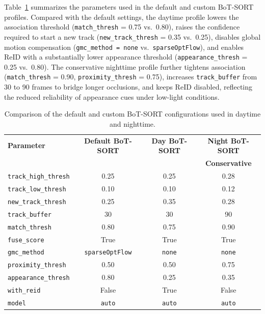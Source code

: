 Table~\ref{tab:botsort-config} summarizes the parameters used in the default and custom BoT-SORT profiles. Compared with the default settings, the daytime profile lowers the association threshold (\texttt{match\_thresh} = 0.75 vs.\ 0.80), raises the confidence required to start a new track (\texttt{new\_track\_thresh} = 0.35 vs.\ 0.25), disables global motion compensation (\texttt{gmc\_method = none} vs.\ \texttt{sparseOptFlow}), and enables ReID with a substantially lower appearance threshold (\texttt{appearance\_thresh} = 0.25 vs.\ 0.80). The conservative nighttime profile further tightens association (\texttt{match\_thresh} = 0.90, \texttt{proximity\_thresh} = 0.75), increases \texttt{track\_buffer} from 30 to 90 frames to bridge longer occlusions, and keeps ReID disabled, reflecting the reduced reliability of appearance cues under low-light conditions.

\begin{table}[H]
\centering
\small
\setlength{\tabcolsep}{8pt}
\renewcommand{\arraystretch}{1.15}
\caption[BoT-SORT configuration parameters]{Comparison of the default and custom BoT-SORT configurations used in daytime and nighttime.}
\begin{tabular}{@{}lccc@{}}
\textbf{Parameter} & \textbf{Default BoT-SORT} & \textbf{Day BoT-SORT} & \textbf{Night BoT-SORT} \\
& & & \textbf{Conservative} \\
\midrule
\texttt{track\_high\_thresh}  & 0.25          & 0.25          & 0.28 \\
\texttt{track\_low\_thresh}   & 0.10          & 0.10          & 0.12 \\
\texttt{new\_track\_thresh}   & 0.25          & 0.35          & 0.28 \\
\texttt{track\_buffer}        & 30            & 30            & 90   \\
\texttt{match\_thresh}        & 0.80          & 0.75          & 0.90 \\
\texttt{fuse\_score}          & True          & True          & True \\
\texttt{gmc\_method}          & \texttt{sparseOptFlow} & \texttt{none} & \texttt{none} \\
\texttt{proximity\_thresh}    & 0.50          & 0.50          & 0.75 \\
\texttt{appearance\_thresh}   & 0.80          & 0.25          & 0.35 \\
\texttt{with\_reid}           & False         & True          & False \\
\texttt{model}                & \texttt{auto} & \texttt{auto} & \texttt{auto} \\
\bottomrule
\end{tabular}
\label{tab:botsort-config}
\end{table}

